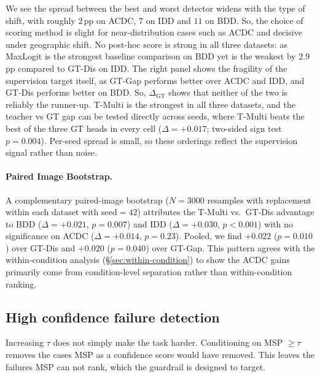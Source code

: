 \documentclass{article}
\begin{document}
We see the spread between the best and worst detector widens with the type of shift, with roughly $2$\,pp on ACDC, $7$ on IDD and $11$ on BDD. So, the choice of scoring method is slight for near-distribution cases such as ACDC and decisive under geographic shift. No post-hoc score is strong in all three datasets: as MaxLogit is the strongest baseline comparison on BDD yet is the weakest by $2.9$\,pp compared to GT-Dis on IDD. The right panel shows the fragility of the supervision target itself, as GT-Gap performs better over ACDC and IDD, and GT-Dis performs better on BDD. So, $\Delta_{\mathrm{GT}}$ shows that neither of the two is reliably the runner-up. T-Multi is the strongest in all three datasets, and the teacher vs GT gap can be tested directly across seeds, where T-Multi beats the best of the three GT heads in every cell ($\Delta{=}{+}0.017$; two-sided sign test $p{=}0.004$). Per-seed spread is small, so these orderings reflect the supervision signal rather than noise.

\paragraph{Paired Image Bootstrap.}
A complementary paired-image bootstrap ($N{=}3000$ resamples with replacement within each dataset with seed${=}42$) attributes the T-Multi vs.\ GT-Dis advantage to BDD ($\Delta{=}{+}0.021$, $p{=}0.007$) and IDD ($\Delta{=}{+}0.030$, $p{<}0.001$) with no significance on ACDC ($\Delta{=}{+}0.014$, $p{=}0.23$). Pooled, we find $+0.022$ ($p{=}0.010$) over GT-Dis and $+0.020$ ($p{=}0.040$) over GT-Gap. This pattern agrees with the within-condition analysis (\S\ref{sec:within-condition}) to show the ACDC gains primarily come from condition-level separation rather than within-condition ranking.


\subsection{High confidence failure detection}

Increasing $\tau$ does not simply make the task harder. Conditioning on MSP $\geq\tau$ removes the cases MSP as a confidence score would have removed. This leaves the failures MSP can not rank, which the guardrail is designed to target.
\end{document}
